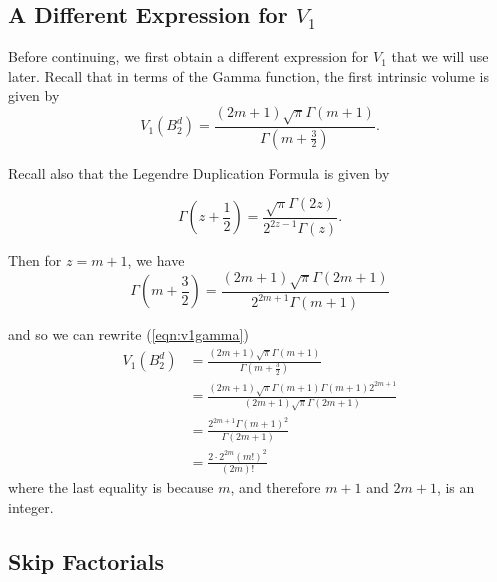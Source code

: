 \documentclass[11pt]{article}
\theoremstyle{definition}
\theoremstyle{definition}
\theoremstyle{plain}
\theoremstyle{plain}
\theoremstyle{plain}
\theoremstyle{definition}
\theoremstyle{definition}
\begin{document}
\subsection*{A Different Expression for $V_1$}

Before continuing, we first obtain a different expression for $V_1$ that we will use later. Recall that in terms of the Gamma function, the first intrinsic volume is given by
\begin{equation}\label{eqn:v1gamma}
V_1(B_2^d) = \frac{(2m+1)\sqrt{\pi}\Gamma(m+1)}{\Gamma\left(m+\frac{3}{2}\right)}.
\end{equation}

Recall also that the Legendre Duplication Formula \cite{weisstein_legendre_nodate} is given by

\begin{equation*}
\Gamma\left(z+\frac{1}{2}\right) = \frac{\sqrt{\pi}\Gamma(2z)}{2^{2z-1}\Gamma(z)}.
\end{equation*}

Then for $z = m+1$, we have
\begin{equation}\label{eqn:threehalves}
\Gamma\left(m+\frac{3}{2}\right) = \frac{(2m+1)\sqrt{\pi}\Gamma(2m+1)}{2^{2m+1}\Gamma(m+1)}
\end{equation}

and so we can rewrite (\ref{eqn:v1gamma})
\begin{equation}\label{eqn:v1simp}
\begin{aligned}
V_1(B_2^d) &= \frac{(2m+1)\sqrt{\pi}\Gamma(m+1)}{\Gamma\left(m+\frac{3}{2}\right)} \\
&= \frac{(2m+1)\sqrt{\pi}\Gamma(m+1)\Gamma(m+1)2^{2m+1}}{(2m+1)\sqrt{\pi}\Gamma(2m+1)} \\
&= \frac{2^{2m+1}\Gamma(m+1)^2}{\Gamma(2m+1)} \\
&= \frac{2\cdot2^{2m}(m!)^2}{(2m)!}
\end{aligned}
\end{equation}
where the last equality is because $m$, and therefore $m+1$ and $2m+1$, is an integer.

\subsection*{Skip Factorials}
\end{document}
